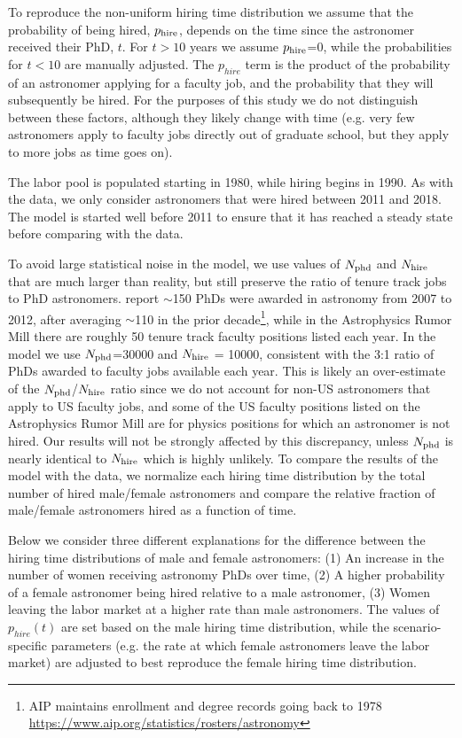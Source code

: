 \documentclass[modern]{aastex62}
\begin{document}
To reproduce the non-uniform hiring time distribution we assume that the probability of being hired, $p_{\rm hire}$, depends on the time since the astronomer received their PhD, $t$. For $t>10$ years we assume $p_{\rm hire}$=0, while the probabilities for $t<10$ are manually adjusted. The $p_{hire}$ term is the product of the probability of an astronomer applying for a faculty job, and the probability that they will subsequently be hired. For the purposes of this study we do not distinguish between these factors, although they likely change with time (e.g. very few astronomers apply to faculty jobs directly out of graduate school, but they apply to more jobs as time goes on).

The labor pool is populated starting in 1980, while hiring begins in 1990. As with the data, we only consider astronomers that were hired between 2011 and 2018. The model is started well before 2011 to ensure that it has reached a steady state before comparing with the data.

To avoid large statistical noise in the model, we use values of $N_{\rm phd}$ and $N_{\rm hire}$ that are much larger than reality, but still preserve the ratio of tenure track jobs to PhD astronomers. \citet{mul14} report $\sim$150 PhDs were awarded in astronomy from 2007 to 2012, after averaging $\sim$110 in the prior decade\footnote{AIP maintains enrollment and degree records going back to 1978 \url{https://www.aip.org/statistics/rosters/astronomy}}, while in the Astrophysics Rumor Mill there are roughly 50 tenure track faculty positions listed each year. In the model we use $N_{\rm phd}$=30000 and $N_{\rm hire}$ = 10000, consistent with the 3:1 ratio of PhDs awarded to faculty jobs available each year. This is likely an over-estimate of the $N_{\rm phd}$/$N_{\rm hire}$ ratio since we do not account for non-US astronomers that apply to US faculty jobs, and some of the US faculty positions listed on the Astrophysics Rumor Mill are for physics positions for which an astronomer is not hired. Our results will not be strongly affected by this discrepancy, unless $N_{\rm phd}$ is nearly identical to $N_{\rm hire}$ which is highly unlikely. To compare the results of the model with the data, we normalize each hiring time distribution by the total number of hired male/female astronomers and compare the relative fraction of male/female astronomers hired as a function of time. 

Below we consider three different explanations for the difference between the hiring time distributions of male and female astronomers: (1) An increase in the number of women receiving astronomy PhDs over time, (2) A higher probability of a female astronomer being hired relative to a male astronomer, (3) Women leaving the labor market at a higher rate than male astronomers. The values of $p_{hire}(t)$ are set based on the male hiring time distribution, while the scenario-specific parameters (e.g. the rate at which female astronomers leave the labor market) are adjusted to best reproduce the female hiring time distribution. 
\end{document}
